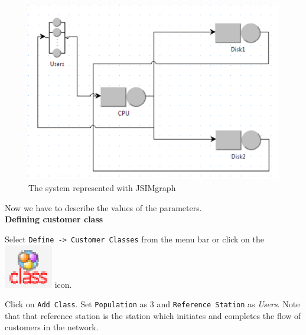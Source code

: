 \begin{figure}[htb]
    \begin{center}
        \includegraphics[scale=.5]{img/jsimg/12.2.eps}
    \end{center}
    \caption{The system represented with JSIMgraph}
    \label{fig:ex1repr}
\end{figure}
Now we have to describe the values of the parameters.\\

\noindent \textbf{Defining customer class} \begin{itemize*} \item
Select \texttt{Define -> Customer Classes} from the menu bar or
click on the
\includegraphics[scale=.5]{img/jsimg/definecustclasses.eps}
icon. \item Click on \texttt{Add Class}. Set \texttt{Population}
as 3 and \texttt{Reference Station} as \emph{Users}. Note that
that reference station is the station which initiates and
completes the flow of customers in the network.
\end{itemize*}

